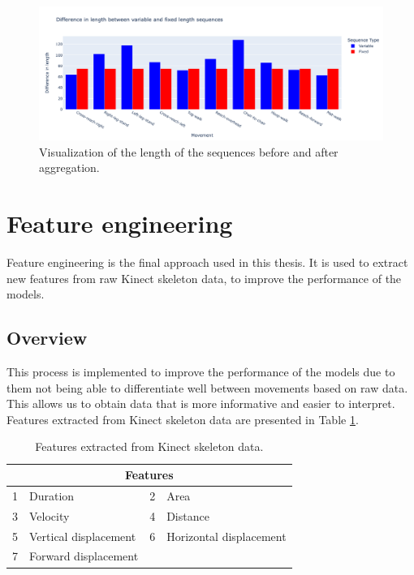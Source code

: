 \begin{figure}[H]
    \centering
    \includegraphics[width=1.0\textwidth]{../src/resources/plots/splits/seq_len.png}
    \caption{
        Visualization of the length of the sequences before and after aggregation.
    }
    \label{fig:seqlength}
\end{figure}

    \newpage
    
    \section{Feature engineering} \label{sec:feature_engineering}
        
        Feature engineering is the final approach used in this thesis. It is used to extract new features from raw Kinect skeleton data, to improve the performance of the models.

        \subsection{Overview}

            This process is implemented to improve the performance of the models due to them not being able to differentiate well between movements based on raw data. This allows us to obtain data that is more informative and easier to interpret. Features extracted from Kinect skeleton data are presented in Table \ref{tab:features_table}.

        \begin{table}[htbp]
            \centering
            \begin{tabular}{@{}clcl@{}}
                \toprule
                \multicolumn{4}{c}{\textbf{Features}} \\
                \midrule
                1 & Duration & 2 & Area \\
                3 & Velocity & 4 & Distance \\
                5 & Vertical displacement & 6 & Horizontal displacement \\
                7 & Forward displacement &  & \\
                \bottomrule
            \end{tabular}
            \caption{Features extracted from Kinect skeleton data.}
            \label{tab:features_table}
        \end{table}

